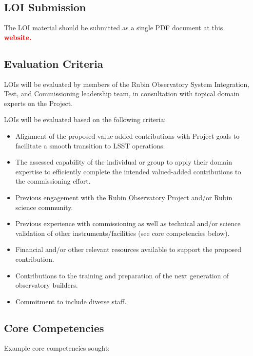 \documentclass[SE,authoryear,toc]{lsstdoc}
\newcommand{\FIXME}[1]{{\bf \textcolor{red}{#1}}}
\begin{document}
\subsection{LOI Submission}

The LOI material should be submitted as a single PDF document at this \FIXME{website.}

\subsection{Evaluation Criteria}

LOIs will be evaluated by members of the Rubin Observatory System Integration, Test, and Commissioning leadership team, in consultation with topical domain experts on the Project.

LOIs will be evaluated based on the following criteria:
\begin{itemize}
\item Alignment of the proposed value-added contributions with Project goals to facilitate a smooth transition to LSST operations.
\item The assessed capability of the individual or group to apply their domain expertise to efficiently complete the intended valued-added contributions to the commissioning effort.
\item Previous engagement with the Rubin Observatory Project and/or Rubin science community.
\item Previous experience with commissioning as well as technical and/or science validation of other instruments/facilities (see core competencies below).
\item Financial and/or other relevant resources available to support the proposed contribution.
\item Contributions to the training and preparation of the next generation of observatory builders.
\item Commitment to include diverse staff.
\end{itemize}

\subsection{Core Competencies}

Example core competencies sought:
\end{document}
